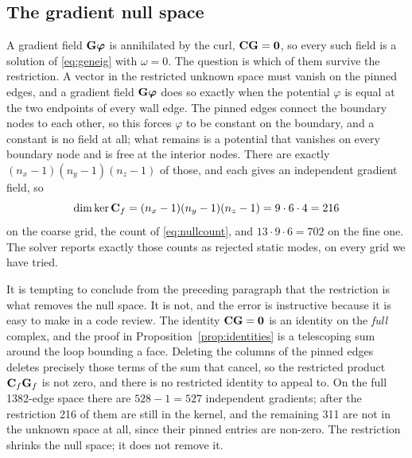 \subsection{The gradient null space} \label{sec:nullspace}

A gradient field $\mathbf{G}\boldsymbol\varphi$ is annihilated by the curl, $\mathbf{C}\mathbf{G}=\mathbf{0}$, so
every such
field is a solution of \eqref{eq:geneig} with $\omega=0$. The question is which of them survive the
restriction.
A vector in the restricted unknown space must vanish on the pinned edges, and a gradient field
$\mathbf{G}\boldsymbol\varphi$
does so exactly when the potential $\varphi$ is equal at the two endpoints of every wall edge. The
pinned edges
connect the boundary nodes to each other, so this forces $\varphi$ to be constant on the boundary,
and a constant
is no field at all; what remains is a potential that vanishes on every boundary node and is free at
the interior
nodes. There are exactly $(n_x-1)(n_y-1)(n_z-1)$ of those, and each gives an independent gradient
field, so
\begin{equation}
  \dim\ker\mathbf{C}_f = (n_x-1)(n_y-1)(n_z-1) = 9\cdot6\cdot4 = 216
  \label{eq:nullcount}
\end{equation}
on the coarse grid, the count of \eqref{eq:nullcount}, and $13\cdot9\cdot6=702$ on the fine one.
The solver reports
exactly those counts as rejected static modes, on every grid we have tried.

It is tempting to conclude from the preceding paragraph that the restriction is what removes the
null space. It is not, and the error is instructive because it is easy to make in a code review. The
identity $\mathbf{C}\mathbf{G}=\mathbf{0}$ is an identity on the \emph{full} complex, and the proof in
Proposition~\ref{prop:identities} is a telescoping sum around the loop bounding a face. Deleting the
columns of the pinned edges deletes precisely those terms of the sum that cancel, so the restricted
product $\mathbf{C}_f\mathbf{G}_f$ is not zero, and there is no restricted identity to appeal to. On the full
1382-edge space there are $528-1=527$ independent gradients; after the restriction 216 of them are
still in the kernel, and the remaining 311 are not in the unknown space at all, since their pinned
entries are non-zero. The restriction shrinks the null space; it does not remove it.

